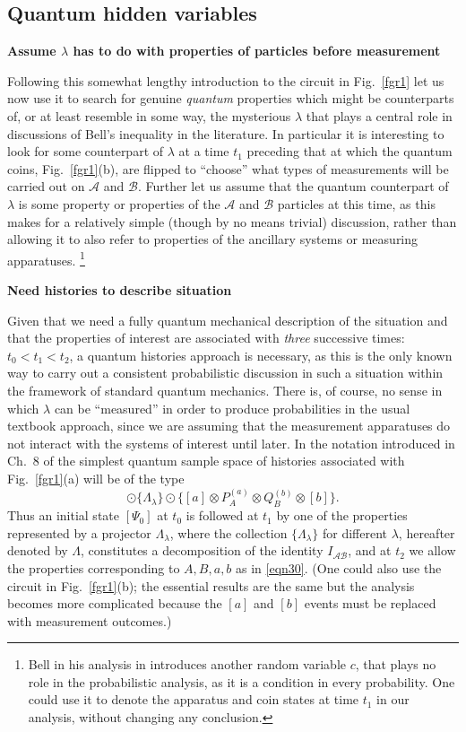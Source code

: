 \documentclass[10pt]{article} %
\def\outl#1{\par{\medskip\noindent\hspace*{.5cm}\bf
      \mathversion{bold}#1\mathversion{normal}\smallskip} }
\def\np{} \def\xa{} \def\xb{} \def\xn{} \def\xp{}
\def\outl#1{} \def\np{} \def\xa{} \def\xb{} \def\xn{} \def\xp{}
\def\outl#1{\par{\medskip\noindent\hspace*{.5cm}\bf
      \mathversion{bold}#1\mathversion{normal}\smallskip} }
\def\np{\newpage }\def\xn{\nopagebreak }\def\xp{\pagebreak }
\newcommand{\od}{\odot }
\newcommand{\ot}{\otimes }
\newcommand{\AM}{{\mathcal A}}
\newcommand{\BM}{{\mathcal B}}
\newcommand{\lm}{\lambda }
\newcommand{\Lm}{\Lambda }
\begin{document}
\xb
\subsection{Quantum hidden variables}
\label{sct5c}
\xa

\xb
\outl{Assume $\lm$ has to do with properties of particles before measurement}
\xa



Following this somewhat lengthy introduction to the circuit in Fig.~\ref{fgr1}
let us now use it to search for genuine \emph{quantum} properties which might
be counterparts of, or at least resemble in some way, the mysterious $\lm$
that plays a central role in discussions of Bell's inequality in the
literature.  In particular it is interesting to look for some counterpart of
$\lm$ at a time $t_1$ preceding that at which the quantum coins,
Fig.~\ref{fgr1}(b), are flipped to ``choose'' what types of measurements will
be carried out on $\AM$ and $\BM$.  Further let us assume that the quantum
counterpart of $\lm$ is some property or properties of the $\AM$ and $\BM$
particles at this time, as this makes for a relatively simple (though by no
means trivial) discussion, rather than allowing it to also refer to properties
of the ancillary systems or measuring apparatuses.%
\footnote{Bell in his analysis in \cite{Bll90b} introduces another random
  variable $c$, that plays no role in the probabilistic analysis, as it is a
  condition in every probability.  One could use it to denote the apparatus
  and coin states at time $t_1$ in our analysis, without changing any
  conclusion.} %

\xb
\outl{Need histories to describe situation}
\xa


Given that we need a fully quantum mechanical description of the situation and
that the properties of interest are associated with \emph{three} successive
times: $t_0<t_1<t_2$, a quantum histories approach is necessary, as this is
the only known way to carry out a consistent probabilistic discussion in such
a situation within the framework of standard quantum mechanics.  There is, of
course, no sense in which $\lm$ can be ``measured'' in order to produce
probabilities in the usual textbook approach, since we are assuming that the
measurement apparatuses do not interact with the systems of interest until
later.  In the notation introduced in Ch.~8 of \cite{Grff02c} the simplest
quantum sample space of histories associated with Fig.~\ref{fgr1}(a) will be
of the type
\begin{equation}
  [\Psi_0] \od \{\Lm_\lm\} \od \{ [a]\ot P^{(a)}_A\ot Q^{(b)}_B  \ot[b]\}.
\label{eqn34}
\end{equation}
Thus an initial state $[\Psi_0]$ at $t_0$ is followed at $t_1$ by one of the
properties represented by a projector $\Lm_\lm$, where the collection
$\{\Lm_\lm\}$ for different $\lm$, hereafter denoted by $\Lm$, constitutes a
decomposition of the identity $I_{\AM\BM}$, and at $t_2$ we allow the
properties corresponding to $A,B,a,b$ as in \eqref{eqn30}.  (One could also
use the circuit in Fig.~\ref{fgr1}(b); the essential results are the same but
the analysis becomes more complicated because the $[a]$ and $[b]$ events must
be replaced with measurement outcomes.)
\end{document}
